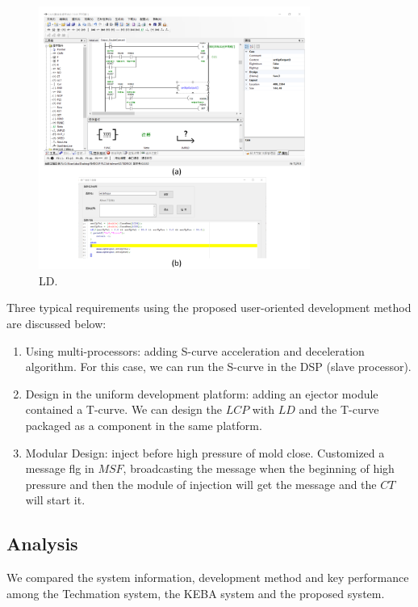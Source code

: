 \documentclass[journal,UTF8]{IEEEtran}
\begin{document}
\begin{figure}
	\centering
	\includegraphics[width=3.5in]{fig/ld.pdf}
	\caption{LD.}
	\label{fig:ld}
\end{figure}

Three typical requirements using the proposed user-oriented development method are discussed below:
\begin{enumerate}
	\item Using multi-processors: adding S-curve acceleration and deceleration algorithm. For this case, we can run the S-curve in the DSP (slave processor).
	\item Design in the uniform development platform: adding an ejector module contained a T-curve. We can design the $LCP$ with $LD$ and the T-curve packaged as a component in the same platform.
	\item Modular Design: inject before high pressure of mold close. Customized a message flg in $MSF$, broadcasting the message when the beginning of high pressure and then the module of injection will get the message and the $CT$ will start it.
\end{enumerate}
\subsection{Analysis}
We compared the system information, development method and key performance among the Techmation system, the KEBA system and the proposed system.
\end{document}
